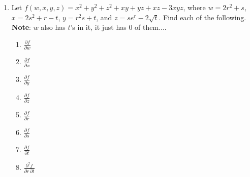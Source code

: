 \documentclass[12 pt]{article}
\newcommand{\note}[1]{\textbf{Note}: #1}
\begin{document}
\begin{enumerate}[leftmargin=0in, rightmargin=-0.25in]
	\item Let $f(w,x,y,z)=x^2+y^2+z^2+xy + yz + xz - 3xyz$, where $w=2r^2+s$, $x=2s^2+r-t$, $y=r^2s+t$, and $z=se^r-2\sqrt{t}$. Find each of the following. \note{$w$ also has $t$'s in it, it just has $0$ of them....}
	\begin{enumerate}[itemsep=0.675in]
		\item $\frac{\partial f}{\partial w}$
		\item $\frac{\partial f}{\partial x}$
		\item $\frac{\partial f}{\partial y}$
		\item $\frac{\partial f}{\partial z}$
		\item $\frac{\partial f}{\partial r}$
		\item $\frac{\partial f}{\partial s}$
		\item $\frac{\partial f}{\partial t}$
		\item $\frac{\partial^2 f}{\partial r\,\partial t}$
	\end{enumerate}

	\newpage
	

\end{enumerate}
\end{document}
